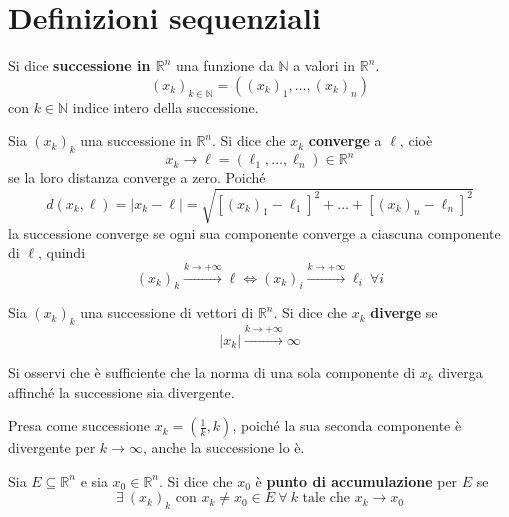 \section{Definizioni sequenziali}
\begin{definition}
    Si dice \textbf{successione in $\mathbb{R}^n$} una funzione da $\mathbb{N}$ a valori in $\mathbb{R}^n$.
    \begin{equation}
        (x_k)_{k \in \mathbb{N}} = ((x_k)_1, \dots, (x_k)_n)  
    \end{equation}
    con $k \in \mathbb{N}$ indice intero della successione.
\end{definition}
\begin{definition}
    Sia $(x_k)_k$ una successione in $\mathbb{R}^n$. Si dice che $x_k$ \textbf{converge} a $\ell$, cioè
    \begin{equation}
        x_k \to \ell=(\ell_1, \dots, \ell_n) \in \mathbb{R}^n
    \end{equation}
    se la loro distanza converge a zero. Poiché 
    \begin{equation}
        d(x_k, \ell)=|x_k-\ell|=\sqrt{[(x_k)_1-\ell_1]^2+\dots+[(x_k)_n-\ell_n]^2}
    \end{equation}
    la successione converge se ogni sua componente converge a ciascuna componente di $\ell$, quindi
    \begin{equation}
        (x_k)_k \overset{k\to+\infty}{\to} \ell \iff (x_k)_i \overset{k\to+\infty}{\to} \ell_i \ \forall i
    \end{equation}
\end{definition}
\begin{definition}
    Sia $(x_k)_k$ una successione di vettori di $\mathbb{R}^n$. Si dice che $x_k$ \textbf{diverge} se
    \begin{equation}
        |x_k| \overset{k\to+\infty}{\to} \infty
    \end{equation}
    \begin{oss}
        Si osservi che è sufficiente che la norma di una sola componente di $x_k$ diverga affinché la successione sia divergente.
        \begin{example}
            Presa come successione $x_k=\left(\frac{1}{k}, k\right)$, poiché la sua seconda componente è divergente per $k \to \infty$, anche la successione lo è.
        \end{example}
    \end{oss}
\end{definition}
\begin{definition} \label{Def: Punto di accumulazione}
    Sia $E \subseteq \mathbb{R}^n$ e sia $x_0 \in \mathbb{R}^n$. Si dice che $x_0$ è \textbf{punto di accumulazione} per $E$ se
    \begin{equation}
        \exists\ (x_k)_k \text{ con } x_k\neq x_0 \in E \ \forall \ k \text{ tale che } x_k \to x_0
    \end{equation}
\end{definition}
